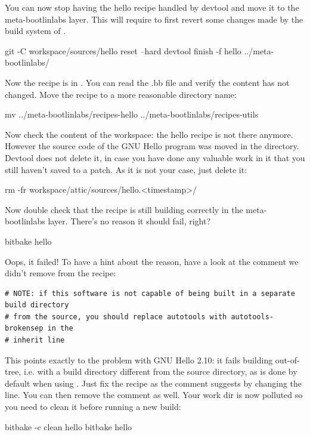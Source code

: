 You can now stop having the hello recipe handled by devtool and move it to
the meta-bootlinlabs layer. This will require to first revert some changes made
by the build system of .
\begin{bashinput}
git -C workspace/sources/hello reset --hard
devtool finish -f hello ../meta-bootlinlabs/
\end{bashinput}

Now the recipe is in
. You can read
the .bb file and verify the content has not changed. Move the recipe to a
more reasonable directory name:
\begin{bashinput}
mv ../meta-bootlinlabs/recipes-hello ../meta-bootlinlabs/recipes-utils
\end{bashinput}

Now check the content of the workspace: the hello recipe is not there
anymore. However the source code of the GNU Hello program was moved in the
 directory. Devtool does not delete it, in
case you have done any valuable work in it that you still haven't saved to
a patch. As it is not your case, just delete it:
\begin{bashinput}
rm -fr workspace/attic/sources/hello.<timestamp>/
\end{bashinput}

Now double check that the recipe is still building correctly in the
meta-bootlinlabs layer. There's no reason it should fail, right?
\begin{bashinput}
bitbake hello
\end{bashinput}

Oops, it failed! To have a hint about the reason, have a look at the
comment we didn't remove from the recipe:
\begin{verbatim}
# NOTE: if this software is not capable of being built in a separate build directory
# from the source, you should replace autotools with autotools-brokensep in the
# inherit line
\end{verbatim}

This points exactly to the problem with GNU Hello 2.10: it fails building
out-of-tree, i.e. with a build directory different from the source
directory, as is done by default when using . Just
fix the recipe as the comment suggests by changing the 
line. You can then remove the comment as well. Your work dir is now
polluted so you need to clean it before running a new build:
\begin{bashinput}
bitbake -c clean hello
bitbake hello
\end{bashinput}

